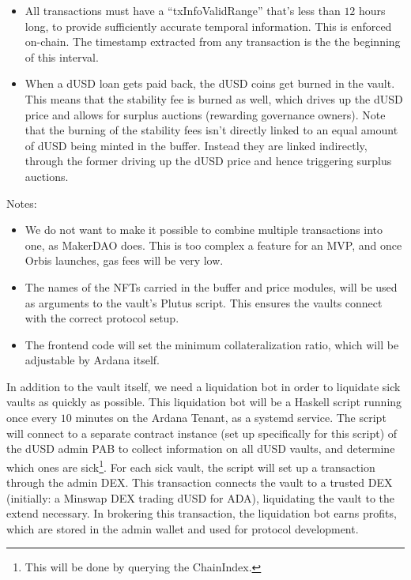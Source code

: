 \documentclass{article} %
\begin{document}
\begin{itemize}
  \item All transactions must have a ``txInfoValidRange'' that's less than $12$
    hours long, to provide sufficiently accurate temporal information. This is
    enforced on-chain. The timestamp extracted from any transaction is the the
    beginning of this interval.
  \item When a dUSD loan gets paid back, the dUSD coins get burned in the vault.
    This means that the stability fee is burned as well, which drives up the
    dUSD price and allows for surplus auctions (rewarding governance owners).
    Note that the burning of the stability fees isn't directly linked to an
    equal amount of dUSD being minted in the buffer.
    Instead they are linked indirectly, through the former driving up the dUSD
    price and hence triggering surplus auctions.
\end{itemize}

Notes:
\begin{itemize}
  \item We do not want to make it possible to combine multiple transactions into
    one, as MakerDAO does.
    This is too complex a feature for an MVP, and once Orbis launches, gas fees
    will be very low.
  \item The names of the NFTs carried in the buffer and price modules, will be
    used as arguments to the vault's Plutus script.
    This ensures the vaults connect with the correct protocol setup.
  \item The frontend code will set the minimum collateralization ratio, which
    will be adjustable by Ardana itself.
\end{itemize}

In addition to the vault itself, we need a liquidation bot in order to liquidate
sick vaults as quickly as possible.
This liquidation bot will be a Haskell script running once every $10$ minutes on
the Ardana Tenant, as a systemd service.
The script will connect to a separate contract instance (set up specifically for
this script) of the dUSD admin PAB to collect information on all dUSD vaults,
and determine which ones are sick\footnote{
  This will be done by querying the ChainIndex.
}.
For each sick vault, the script will set up a transaction through the admin DEX.
This transaction connects the vault to a trusted DEX (initially: a Minswap DEX
trading dUSD for ADA), liquidating the vault to the extend necessary.
In brokering this transaction, the liquidation bot earns profits, which are
stored in the admin wallet and used for protocol development.
\end{document}

